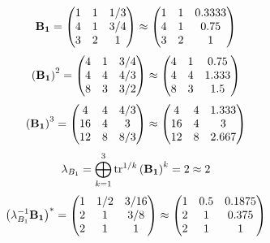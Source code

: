 \documentclass[10pt,a4paper]{article}
\begin{document}
	\[
		\bold{B_1} = 
		\begin{pmatrix}
			{1}{} & {1}{} & {1} / {{3}} \\
			{{4}}{} & {1}{} & {{3}} / {{4}} \\
			{{3}}{} & {{2}}{} & {1}{} \\
		\end{pmatrix}
		\approx
		\begin{pmatrix}
			1        & 1        & 0.3333   \\
			4        & 1        & 0.75     \\
			3        & 2        & 1        \\
		\end{pmatrix}
	\]
	\[
		\left(\bold{B_1}\right)^{2} = 
		\begin{pmatrix}
			{{4}}{} & {1}{} & {{3}} / {{4}} \\
			{{4}}{} & {{4}}{} & {{4}} / {{3}} \\
			{{8}}{} & {{3}}{} & {{3}} / {{2}} \\
		\end{pmatrix}
		\approx
		\begin{pmatrix}
			4        & 1        & 0.75     \\
			4        & 4        & 1.333    \\
			8        & 3        & 1.5      \\
		\end{pmatrix}
	\]
	\[
		\left(\bold{B_1}\right)^{3} = 
		\begin{pmatrix}
			{{4}}{} & {{4}}{} & {{4}} / {{3}} \\
			{{16}}{} & {{4}}{} & {{3}}{} \\
			{{12}}{} & {{8}}{} & {{8}} / {{3}} \\
		\end{pmatrix}
		\approx
		\begin{pmatrix}
			4        & 4        & 1.333    \\
			16       & 4        & 3        \\
			12       & 8        & 2.667    \\
		\end{pmatrix}
	\]
	\[
		\lambda_{B_1} =  \bigoplus ^{3} _{k = 1} \operatorname{tr} ^{1 / k} \left( \bold{B_1} \right)^k = {{2}}{}\approx 2
	\]
	\[
		\left(\lambda_{B_1}^{-1}\bold{B_1}\right)^* = 
		\begin{pmatrix}
			{1}{} & {1} / {{2}} & {{3}} / {{16}} \\
			{{2}}{} & {1}{} & {{3}} / {{8}} \\
			{{2}}{} & {1}{} & {1}{} \\
		\end{pmatrix}
		\approx
		\begin{pmatrix}
			1        & 0.5      & 0.1875   \\
			2        & 1        & 0.375    \\
			2        & 1        & 1        \\
		\end{pmatrix}
	\]
\end{document}
